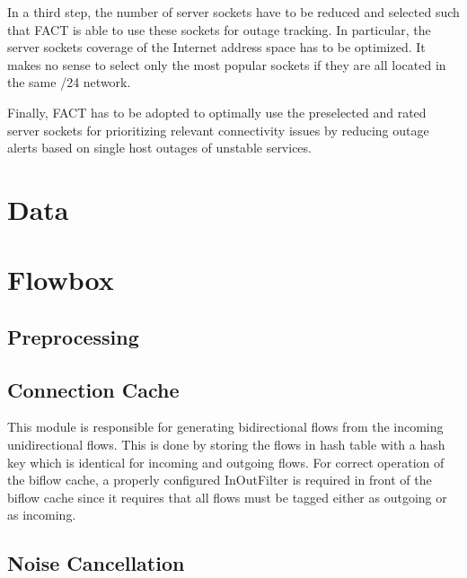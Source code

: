 In a third step, the number of server sockets have to be reduced and selected
such that FACT is able to use these sockets for outage tracking. In particular,
the server sockets coverage of the Internet address space has to be optimized.
It makes no sense to select only the most popular sockets if they are all
located in the same /24 network.

Finally, FACT has to be adopted to optimally use the preselected and rated
server sockets for prioritizing relevant connectivity issues by reducing outage
alerts based on single host outages of unstable services.

\section{Data
\label{section:data}}

\section{Flowbox
\label{section:flowbox}}

\subsection{Preprocessing}

\subsection{Connection Cache} This module is responsible for generating
bidirectional flows from the incoming unidirectional flows. This is done by
storing the flows in hash table with a hash key which is identical for incoming
and outgoing flows. For correct operation of the biflow cache, a properly
configured InOutFilter is required in front of the biflow cache since it
requires that all flows must be tagged either as outgoing or as incoming. 

\subsection{Noise Cancellation} 
